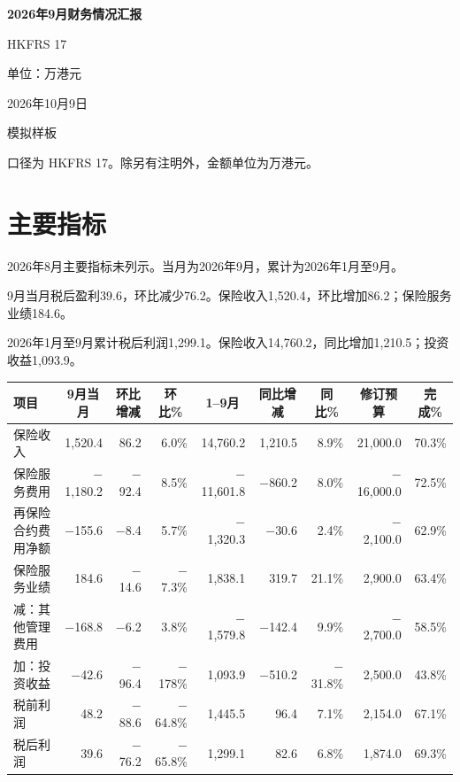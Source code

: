 \documentclass[11pt,a4paper,fontset=fandol]{ctexart}
\newenvironment{reporttable}[1]{%
  \par\addvspace{0.75em}%
  \noindent\begin{minipage}{\textwidth}%
  \centering
  \captionof{table}{#1}\par\smallskip
  \small\setlength{\tabcolsep}{3.4pt}\renewcommand{\arraystretch}{1.18}%
}{%
  \end{minipage}\par\addvspace{0.55em}%
}
\begin{document}
\begin{titlepage}
\thispagestyle{empty}
\centering
\vspace*{0.20\textheight}
{\bfseries 2026年9月财务情况汇报\par}
\vspace{1.8em}
{ HKFRS 17\par}
\vspace{0.9em}
{ 单位：万港元\par}
\vspace{2.6em}
{ 2026年10月9日\par}
\vspace{1.4em}
{ 模拟样板\par}
\vfill
\end{titlepage}

\noindent 口径为 HKFRS 17。除另有注明外，金额单位为万港元。

\section{主要指标}

2026年8月主要指标未列示。当月为2026年9月，累计为2026年1月至9月。

9月当月税后盈利39.6，环比减少76.2。保险收入1,520.4，环比增加86.2；保险服务业绩184.6。

2026年1月至9月累计税后利润1,299.1。保险收入14,760.2，同比增加1,210.5；投资收益1,093.9。

\begin{reporttable}{2026年9月主要指标}
\begin{tabularx}{\textwidth}{@{}>{\raggedright\arraybackslash}Xrrrrrrrr@{}}
\toprule
项目 & \multicolumn{1}{c}{9月当月} & \multicolumn{1}{c}{环比增减} & \multicolumn{1}{c}{环比\%} & \multicolumn{1}{c}{1--9月} & \multicolumn{1}{c}{同比增减} & \multicolumn{1}{c}{同比\%} & \multicolumn{1}{c}{修订预算} & \multicolumn{1}{c}{完成\%} \\
\midrule
保险收入 & 1,520.4 & 86.2 & 6.0\% & 14,760.2 & 1,210.5 & 8.9\% & 21,000.0 & 70.3\% \\
保险服务费用 & $-$1,180.2 & $-$92.4 & 8.5\% & $-$11,601.8 & $-$860.2 & 8.0\% & $-$16,000.0 & 72.5\% \\
再保险合约费用净额 & $-$155.6 & $-$8.4 & 5.7\% & $-$1,320.3 & $-$30.6 & 2.4\% & $-$2,100.0 & 62.9\% \\
保险服务业绩 & 184.6 & $-$14.6 & $-$7.3\% & 1,838.1 & 319.7 & 21.1\% & 2,900.0 & 63.4\% \\
减：其他管理费用 & $-$168.8 & $-$6.2 & 3.8\% & $-$1,579.8 & $-$142.4 & 9.9\% & $-$2,700.0 & 58.5\% \\
加：投资收益 & $-$42.6 & $-$96.4 & $-$178\% & 1,093.9 & $-$510.2 & $-$31.8\% & 2,500.0 & 43.8\% \\
税前利润 & 48.2 & $-$88.6 & $-$64.8\% & 1,445.5 & 96.4 & 7.1\% & 2,154.0 & 67.1\% \\
税后利润 & 39.6 & $-$76.2 & $-$65.8\% & 1,299.1 & 82.6 & 6.8\% & 1,874.0 & 69.3\% \\
\bottomrule
\end{tabularx}
\end{reporttable}
\end{document}
